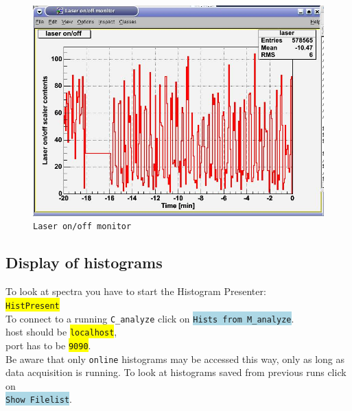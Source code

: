 \documentclass[10pt]{article}
\newcommand{\blue}[1]{\colorbox{lightblue}{\texttt{#1}}}
\newcommand{\yellow}[1]{\colorbox{yellow}{\texttt{#1}}}
\begin{document}
\begin{center}
\begin{figure}[H]
\centerline{\includegraphics[width=\linewidth]{LaserMonitor}}
\caption{\texttt{Laser on/off monitor}}
\label{LaserMonitor}
\end{figure}
\end{center}
\newpage
\subsection{Display of histograms}\vspace{3mm}

To look at spectra you have to start the Histogram Presenter:\\

\hspace*{.2\linewidth}\yellow{HistPresent}\\

To connect to a running \texttt{C\_analyze} click on \blue{Hists from M\_analyze}.\\

\hspace*{.2\linewidth}host should be \yellow{localhost},\\
\hspace*{.2\linewidth}port has to be \yellow{9090}.\\

Be aware that only \texttt{online} histograms may be accessed this way, only as long as data acquisition is running.
To look at histograms saved from previous runs click on\\

\hspace*{.2\linewidth}\blue{Show Filelist}.
\end{document}
